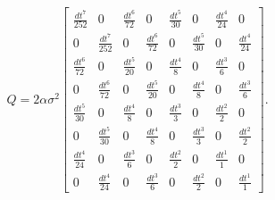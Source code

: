 \documentclass{article}
\begin{document}
\begin{equation}
	Q=2\alpha\sigma^2\begin{bmatrix}
	\frac{dt^7}{252} & 0 & \frac{dt^6}{72} & 0 & \frac{dt^5}{30} & 0 & \frac{dt^4}{24} & 0\\
	0 & \frac{dt^7}{252} & 0 & \frac{dt^6}{72} & 0 & \frac{dt^5}{30} & 0 & \frac{dt^4}{24}\\
	\frac{dt^6}{72} & 0 & \frac{dt^5}{20} & 0 & \frac{dt^4}{8} & 0 & \frac{dt^3}{6} & 0 \\
	0 & \frac{dt^6}{72} & 0 & \frac{dt^5}{20} & 0 & \frac{dt^4}{8} & 0 & \frac{dt^3}{6} \\
	\frac{dt^5}{30} & 0 & \frac{dt^4}{8} & 0 & \frac{dt^3}{3} & 0 & \frac{dt^2}{2} & 0\\
	0 & \frac{dt^5}{30} & 0 & \frac{dt^4}{8} & 0 & \frac{dt^3}{3} & 0 & \frac{dt^2}{2} \\ 
	\frac{dt^4}{24} & 0 & \frac{dt^3}{6} & 0 & \frac{dt^2}{2} & 0 & \frac{dt^1}{1} & 0\\
	0 & \frac{dt^4}{24} & 0 & \frac{dt^3}{6} & 0 & \frac{dt^2}{2} & 0 & \frac{dt^1}{1}
	\end{bmatrix}.
\end{equation}
\end{document}
